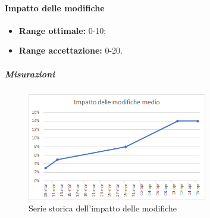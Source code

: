 			\paragraph{Impatto delle modifiche} \Spazio
			\begin{itemize}
				\item {\textbf{Range ottimale:} 0-10;}
				\item {\textbf{Range accettazione:} 0-20.}
			\end{itemize} 
		 \subparagraph{Misurazioni}
		\begin{figure}[H]
			\centering 
			\includegraphics[width=0.7\textwidth]{Images/modifiche.png}
			\caption{Serie storica dell'impatto delle modifiche}
			\label{modifiche} 
		\end{figure}
